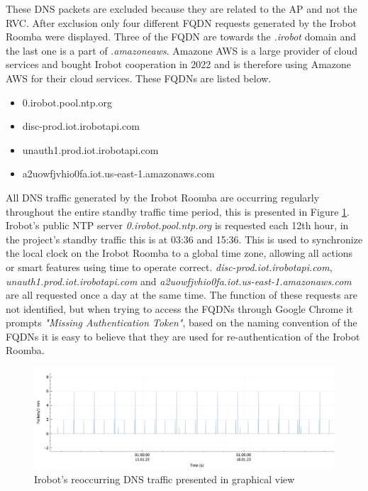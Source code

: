 These \gls{DNS} packets are excluded because they are related to the \gls{AP} and not the \gls{RVC}. After exclusion only four different \gls{FQDN} requests generated by the Irobot Roomba were displayed. Three of the \gls{FQDN} are towards the \textit{.irobot} domain and the last one is a part of .\textit{amazoneaws}. Amazone \gls{AWS} is a large provider of cloud services and bought Irobot cooperation in 2022 \cite{irobot2023_amazone} and is therefore using Amazone \gls{AWS} for their cloud services. These \gls{FQDN}s are listed below. 

\begin{itemize}
    \item 0.irobot.pool.ntp.org
    \item disc-prod.iot.irobotapi.com
    \item unauth1.prod.iot.irobotapi.com
    \item a2uowfjvhio0fa.iot.us-east-1.amazonaws.com
\end{itemize}

All \gls{DNS} traffic generated by the Irobot Roomba are occurring regularly throughout the entire standby traffic time period, this is presented in Figure \ref{fig:dns_irobot_graph}. Irobot's public NTP server \textit{0.irobot.pool.ntp.org} is requested each 12th hour,  in the project's standby traffic this is at 03:36 and 15:36. This is used to synchronize the local clock on the Irobot Roomba to a global time zone, allowing all actions or smart features using time to operate correct. \textit{disc-prod.iot.irobotapi.com}, \textit{unauth1.prod.iot.irobotapi.com} and \textit{a2uowfjvhio0fa.iot.us-east-1.amazonaws.com} are all requested once a day at the same time. The function of these requests are not identified, but when trying to access the \gls{FQDN}s through Google Chrome it prompts \textit{"Missing Authentication Token"}, based on the naming convention of the \gls{FQDN}s it is easy to believe that they are used for re-authentication of the Irobot Roomba. 

\begin{figure}[H]
    \centering
    \includegraphics[width=\textwidth]{figures/DNS_irobot_graph.png}
    \caption{Irobot's reoccurring \gls{DNS} traffic presented in graphical view}
    \label{fig:dns_irobot_graph}
\end{figure}

